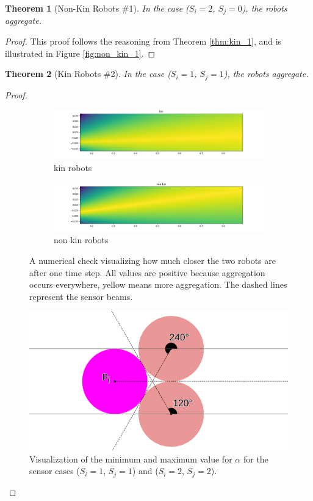 \documentclass[letterpaper, 10 pt, conference]{ieeeconf}
\newtheorem{theorem}{Theorem}
\begin{document}
\begin{theorem}[Non-Kin Robots \#1]\label{thm:non_kin_1}
  In the case ($S_i=2$, $S_j=0$), the robots aggregate.
\end{theorem}
\begin{proof}

  This proof follows the reasoning from Theorem \ref{thm:kin_1}, and is illustrated in Figure \ref{fig:non_kin_1}.
\end{proof}

\begin{theorem}[Kin Robots \#2]\label{thm:kin_2}
  In the case ($S_i=1$, $S_j=1$), the robots aggregate.
\end{theorem}
\begin{proof}

  \begin{figure}
    \centering
    \begin{subfigure}[t]{1\columnwidth}
      \includegraphics[width=0.9\columnwidth]{./images/kin_2}
      \caption{kin robots}
      \label{fig:kin_2}
    \end{subfigure}

    \begin{subfigure}[t]{1\columnwidth}
      \includegraphics[width=0.9\columnwidth]{./images/non_kin_2}
      \caption{non kin robots}
      \label{fig:non_kin_2}
    \end{subfigure}
    \caption{A numerical check visualizing how much closer the two robots are after one time step. All values are positive because aggregation occurs everywhere, yellow means more aggregation. The dashed lines represent the sensor beams.}
  \end{figure}

  \begin{figure}[t]
    \centering
    \includegraphics[width=.7\columnwidth]{./images/min_max_alpha}
    \caption{Visualization of the minimum and maximum value for $\alpha$ for the sensor cases ($S_i=1$, $S_j=1$) and ($S_i=2$, $S_j=2$).}
    \label{fig:min_max_alpha}
  \end{figure}


\end{proof}
\end{document}

